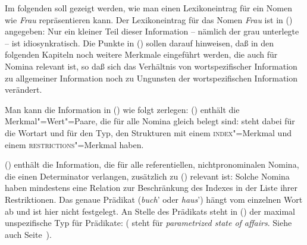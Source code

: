 Im folgenden soll gezeigt werden, wie man einen Lexikoneintrag für ein Nomen wie \emph{Frau} repräsentieren
kann. Der Lexikoneintrag für das Nomen \emph{Frau} ist in () angegeben:
\ea
{}
\z
Nur ein kleiner Teil dieser Information -- nämlich der grau unterlegte -- ist idiosynkratisch.
Die Punkte in () sollen darauf hinweisen, daß in den folgenden Kapiteln noch weitere Merkmale
eingeführt werden, die auch für Nomina relevant ist, so daß sich das Verhältnis von wortspezifischer
Information zu allgemeiner Information noch zu Ungunsten der wortspezifischen Information
verändert.

Man kann die Information in () wie folgt zerlegen: () enthält
die Merkmal"=Wert"=Paare, die für alle Nomina gleich belegt sind:
\ea
{}
\z
{} steht dabei für die Wortart und  für den Typ,
den Strukturen mit einem \textsc{index}"=Merkmal und einem \textsc{restrictions}"=Merkmal
haben.

() enthält die Information, die für alle referentiellen, nichtpronominalen Nomina,
die einen Determinator verlangen, zusätzlich zu () relevant ist:
\ea
{}
\z
Solche Nomina haben mindestens eine Relation zur Beschränkung des Indexes in der Liste
ihrer Restriktionen. Das genaue Prädikat (\emph{buch}' oder \emph{haus}') hängt vom einzelnen
Wort ab und ist hier nicht festgelegt. An Stelle des Prädikats steht in ()
der maximal unspezifische Typ für Prädikate:  ( steht für
\emph{parametrized state of affairs\/}. Siehe auch Seite~\pageref{page-psoa}).

